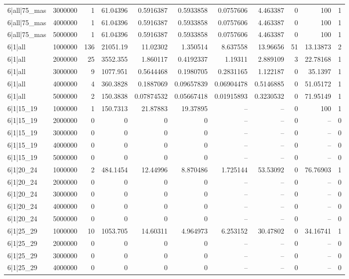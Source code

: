 \begin{tabular}{lrrrrrrrrrr}
6|all|75\_mas & 3000000 & 1 & 61.04396 & 0.5916387 & 0.5933858 & 0.0757606 & 4.463387 & 0 & 100 & 1 \\
6|all|75\_mas & 4000000 & 1 & 61.04396 & 0.5916387 & 0.5933858 & 0.0757606 & 4.463387 & 0 & 100 & 1 \\
6|all|75\_mas & 5000000 & 1 & 61.04396 & 0.5916387 & 0.5933858 & 0.0757606 & 4.463387 & 0 & 100 & 1 \\
6|1|all & 1000000 & 136 & 21051.19 & 11.02302 & 1.350514 & 8.637558 & 13.96656 & 51 & 13.13873 & 2 \\
6|1|all & 2000000 & 25 & 3552.355 & 1.860117 & 0.4192337 & 1.19311 & 2.889109 & 3 & 22.78168 & 1 \\
6|1|all & 3000000 & 9 & 1077.951 & 0.5644468 & 0.1980705 & 0.2831165 & 1.122187 & 0 & 35.1397 & 1 \\
6|1|all & 4000000 & 4 & 360.3828 & 0.1887069 & 0.09657839 & 0.06904478 & 0.5146885 & 0 & 51.05172 & 1 \\
6|1|all & 5000000 & 2 & 150.3838 & 0.07874532 & 0.05667418 & 0.01915893 & 0.3230532 & 0 & 71.95149 & 1 \\
6|1|15\_19 & 1000000 & 1 & 150.7313 & 21.87883 & 19.37895 & -- & -- & 0 & 100 & 1 \\
6|1|15\_19 & 2000000 & 0 & 0 & 0 & 0 & -- & -- & 0 & -- & 0 \\
6|1|15\_19 & 3000000 & 0 & 0 & 0 & 0 & -- & -- & 0 & -- & 0 \\
6|1|15\_19 & 4000000 & 0 & 0 & 0 & 0 & -- & -- & 0 & -- & 0 \\
6|1|15\_19 & 5000000 & 0 & 0 & 0 & 0 & -- & -- & 0 & -- & 0 \\
6|1|20\_24 & 1000000 & 2 & 484.1454 & 12.44996 & 8.870486 & 1.725144 & 53.53092 & 0 & 76.76903 & 1 \\
6|1|20\_24 & 2000000 & 0 & 0 & 0 & 0 & -- & -- & 0 & -- & 0 \\
6|1|20\_24 & 3000000 & 0 & 0 & 0 & 0 & -- & -- & 0 & -- & 0 \\
6|1|20\_24 & 4000000 & 0 & 0 & 0 & 0 & -- & -- & 0 & -- & 0 \\
6|1|20\_24 & 5000000 & 0 & 0 & 0 & 0 & -- & -- & 0 & -- & 0 \\
6|1|25\_29 & 1000000 & 10 & 1053.705 & 14.60311 & 4.964973 & 6.253152 & 30.47802 & 0 & 34.16741 & 1 \\
6|1|25\_29 & 2000000 & 0 & 0 & 0 & 0 & -- & -- & 0 & -- & 0 \\
6|1|25\_29 & 3000000 & 0 & 0 & 0 & 0 & -- & -- & 0 & -- & 0 \\
6|1|25\_29 & 4000000 & 0 & 0 & 0 & 0 & -- & -- & 0 & -- & 0 \\

\end{tabular}
